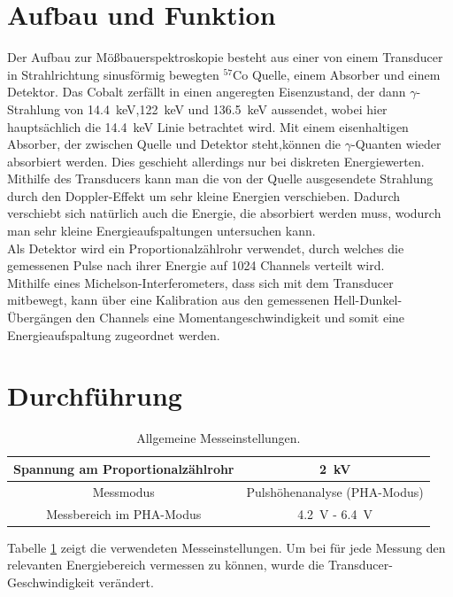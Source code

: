 \documentclass[12pt,a4paper]{article}
\begin{document}
\section{Aufbau und Funktion}
Der Aufbau zur Mößbauerspektroskopie besteht aus einer von einem Transducer in Strahlrichtung sinusförmig bewegten $^{57}$Co Quelle, einem Absorber und einem Detektor. Das Cobalt zerfällt in einen angeregten Eisenzustand, der dann $\gamma$-Strahlung von \SI{14,4}{keV},\SI{122}{keV} und \SI{136.5}{keV} aussendet, wobei hier hauptsächlich die \SI{14,4}{keV} Linie betrachtet wird. Mit einem eisenhaltigen Absorber, der zwischen Quelle und Detektor steht,können die $\gamma$-Quanten wieder absorbiert werden. Dies geschieht allerdings nur bei diskreten Energiewerten. Mithilfe des Transducers kann man die von der Quelle ausgesendete Strahlung durch den Doppler-Effekt um sehr kleine Energien verschieben. Dadurch verschiebt sich natürlich auch die Energie, die absorbiert werden muss, wodurch man sehr kleine Energieaufspaltungen untersuchen kann.\\
Als Detektor wird ein Proportionalzählrohr verwendet, durch welches die gemessenen Pulse nach ihrer Energie auf 1024 Channels verteilt wird.\\
Mithilfe eines Michelson-Interferometers, dass sich mit dem Transducer mitbewegt, kann über eine Kalibration aus den gemessenen Hell-Dunkel-Übergängen den Channels eine Momentangeschwindigkeit und somit eine Energieaufspaltung zugeordnet werden.

\section{Durchführung}

\begin{table}
\centering
\begin{tabular}{|c|c|}
\hline 
Spannung am Proportionalzählrohr & \SI{2}{kV} \\ 
\hline 
Messmodus & Pulshöhenanalyse (PHA-Modus) \\
\hline 
Messbereich im PHA-Modus & \SI{4,2}{V} - \SI{6,4}{V} \\
\hline 
\end{tabular} 
\caption{Allgemeine Messeinstellungen.}
\label{tab:Mess_Einstellungen}
\end{table}

Tabelle \ref{tab:Mess_Einstellungen} zeigt die verwendeten Messeinstellungen. Um bei für jede Messung den relevanten Energiebereich vermessen zu können, wurde die Transducer-Geschwindigkeit verändert.
\end{document}
